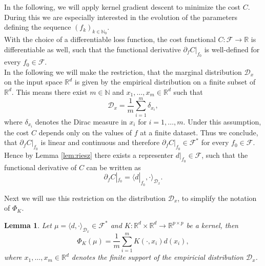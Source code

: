 \documentclass[11pt, a4paper]{article}
\newtheorem{lemma}[theorem]{Lemma}
\newcommand{\N}{\mathds{N}}
\newcommand{\R}{\mathds{R}}
\newcommand{\D}{\mathcal{D}}
\newcommand{\F}{\mathcal{F}}
\begin{document}
In the following, we will apply kernel gradient descent to minimize the cost $C$. During this we are especially interested in the evolution of the parameters defining the sequence $(f_k)_{k \in \N_0}$. \\

With the choice of a differentiable loss function, the cost functional $C : \F \to \R$ is differentiable as well, such that the functional derivative $\partial_{f} C |_{f_0}$ is well-defined for every $f_0 \in \F$. \\

In the following we will make the restriction, that the marginal distribution $\D_x$ on the input space $\R^d$ is given by the empirical distribution on a finite subset of $\R^d$. This means there exist $m \in \N$ and $x_1, \dots, x_m \in \R^d$ such that 
\[ \D_x = \frac{1}{m} \sum_{i=1}^{m} \delta_{x_i}, \]
where $\delta_{x_i}$ denotes the Dirac measure in $x_i$ for $i=1,\dots,m$. Under this assumption, the cost $C$ depends only on the values of $f$ at a finite dataset. Thus we conclude, that $\partial_{f} C |_{f_0}$ is linear and continuous and therefore $\partial_{f} C |_{f_0} \in \F^*$ for every $f_0 \in \F$. Hence by Lemma \ref{lem:riesz} there exists a representer $d|_{f_0} \in \F$, such that the functional derivative of $C$ can be written as
\[ \partial_{f} C |_{f_0} = \big \langle d|_{f_0}, \cdot \big \rangle_{\D_x}. \]

Next we will use this restriction on the distribution $\D_x$, to simplify the notation of $\Phi_K$.

\begin{lemma} \label{lem:phi}
Let $\mu = \langle d, \cdot \rangle_{\D_x} \in \F^*$ and $K: \R^d \times \R^d \to \R^{p \times p}$ be a kernel, then
\[ \Phi_K(\mu) = \frac{1}{m}\sum_{i=1}^{m} K(\cdot,x_i)d(x_i), \]
where $x_1, \dots, x_m \in \R^d$ denotes the finite support of the empiricial distribution $\D_x$.
\end{lemma}
\end{document}
